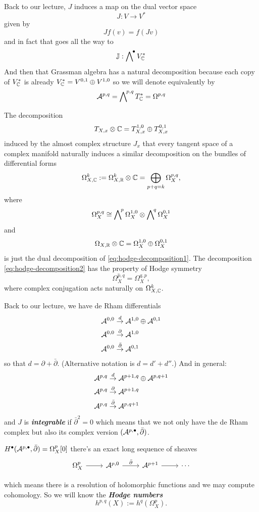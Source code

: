 Back to our lecture, $J$ induces a map on the dual vector space
\[J:V\to V^*\]
given by
\[Jf(v)= f(Jv)\]
and in fact that goes all the way to
\[\mathbb{J}:\extp^{\bullet}V_{\C}^*\]
And then that Grassman algebra has a natural decomposition because each copy of $V^*_{\mathbb{C}}$ is already $V^*_{\mathbb{C}}=V^{0,1}\oplus V^{1,0}$ so we will denote equivalently by
\[\Ac^{p,q}=\extp^{p,q}T^*_{\C}=\Omega^{p,q}\]
\begin{remark}
	The decomposition
	\begin{equation}\label{eq:hodge-decomposition1}
		T_{X,x}\otimes\mathbb{C}=T^{1,0}_{X,x}\oplus T^{0,1}_{X,x}
	\end{equation}
	induced by the almost complex structure $J_x$ that every tangent space of a complex manifold naturally induces a similar decomposition on the bundles of differential forms
	\[\Omega_{X,\mathbb{C}}^k:=\Omega_{X,\mathbb{R}}^k\otimes\mathbb{C}=\bigoplus_{p+q=k}\Omega_X^{p,q},\]
	where
	\begin{equation}\label{eq:hodge-decomposition2}
		\Omega^{p,q}_X\cong \extp^p\Omega^{1,0}_X\otimes\extp^q\Omega^{0,1}_X
	\end{equation}
	and
	\[\Omega_{X,\mathbb{R}}\otimes\mathbb{C}=\Omega^{1,0}_X\oplus\Omega^{0,1}_X\]
	is just the dual decomposition of \cref{eq:hodge-decomposition1}. The decomposition \cref{eq:hodge-decomposition2} has the property of Hodge symmetry
	\[\overline{\Omega_X^{p,q}}=\Omega^{q,p}_X,\]
	where complex conjugation acts naturally on $\Omega^k_{X,\mathbb{C}}$.
\end{remark}
Back to our lecture, we have de Rham differentials 
\begin{align*}
	\mathcal{A}^{0,0}&\overset{d}{\to}\mathcal{A}^{1,0}\oplus\mathcal{A}^{0,1}\\
	\mathcal{A}^{0,0}&\overset{\partial}{\to}\mathcal{A}^{1,0}\\
	\mathcal{A}^{0,0}&\overset{\bar\partial}{\to}\mathcal{A}^{0,1}
\end{align*}
so that $d=\partial+\bar\partial$. (Alternative notation is $d=d'+d''$.) And in general:
\begin{align*}
	\mathcal{A}^{p,q}&\overset{d}{\to}\mathcal{A}^{p+1,q}\oplus\mathcal{A}^{p,q+1}\\
	\mathcal{A}^{p,q}&\overset{\partial}{\to}\mathcal{A}^{p+1,q}\\
	\mathcal{A}^{p,q}&\overset{\bar\partial}{\to}\mathcal{A}^{p,q+1}
\end{align*}
and $J$ is \textbf{\textit{integrable}} if $\bar\partial^2=0$ which means that we not only have the de Rham complex but also its complex version $(\mathcal{A}^{p,\bullet},\bar\partial)$.
\begin{lemma}
	$H^\bullet(\mathcal{A}^{p,\bullet},\bar\partial)=\Omega^p_X[0]$ there's an exact long sequence of sheaves
	\[\begin{tikzcd}
		\Omega_X^p\arrow[r]&\Ac^{p,0}\arrow[r,"\bar\partial"]&\Ac^{p+1}\arrow[r]&\cdots
	\end{tikzcd}\]
\end{lemma}
which means there is a resolution of holomorphic functions and we may compute cohomology. So we will know the \textbf{\textit{Hodge numbers}}
\[h^{p,q}(X):=h^q(\Omega^p_X).\]

